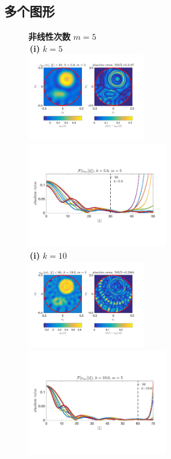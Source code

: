 \subsection{多个图形}
\begin{figure}[H]
\centering
\textbf{非线性次数} $m = 5$ \\[1ex]
\,\hfill \textbf{(i)} $k = 5$ \hfill\,\\
\includegraphics[width=0.45\textwidth,trim=20 60 20 35,clip]{./figs/pwc_5_Ic_0050.png}
\includegraphics[width=0.54\textwidth,trim=10 60 30 90,clip]{./figs/pwc_5_Fc_0050.png}\\
\,\hfill \textbf{(i)} $k = 10$ \hfill\,\\
\includegraphics[width=0.45\textwidth,trim=20 60 20 35,clip]{./figs/pwc_5_Ic_0100.png}
\includegraphics[width=0.54\textwidth,trim=10 60 30 90,clip]{./figs/pwc_5_Fc_0100.png}\\

\end{figure}
